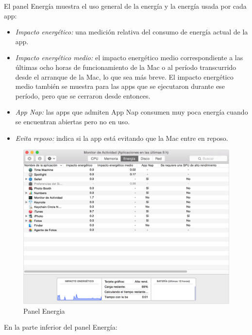 \documentclass[a4paper,11pt]{article}
\begin{document}
El panel Energía muestra el uso general de la energía y la energía usada por cada app:

\begin{itemize}
  \item \textit{Impacto energético:} una medición relativa del consumo de energía actual de la app.
  \item \textit{Impacto energético medio:} el impacto energético medio correspondiente a las últimas ocho horas de funcionamiento de la Mac o al período transcurrido desde el arranque de la Mac, lo que sea más breve. El impacto energético medio también se muestra para las apps que se ejecutaron durante ese período, pero que se cerraron desde entonces.
  \item \textit{App Nap:} las apps que admiten App Nap consumen muy poca energía cuando se encuentran abiertas pero no en uso.
  \item \textit{Evita reposo:} indica si la app está evitando que la Mac entre en reposo.
\end{itemize}

\begin{figure}[H]
  \centering
  \includegraphics[width=1\textwidth]{03macActivityMonitorEnergy}
  \caption{Panel Energia}
  \label{fig:macActivityMonitorEnergy}
\end{figure}

En la parte inferior del panel Energía:
\end{document}
